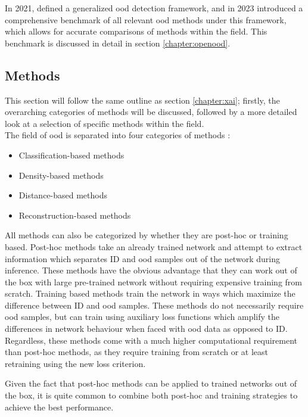\documentclass[UKenglish]{uiomasterthesis} %
\theoremstyle{definition}
\begin{document}
In 2021, \cite{oodoverview} defined a generalized \ac{ood} detection framework, and in 2023 \cite{openood} introduced a comprehensive benchmark of all relevant \ac{ood} methods under this framework, which allows for accurate comparisons of methods within the field. This benchmark is discussed in detail in section \ref{chapter:openood}.

\subsection{Methods}

This section will follow the same outline as section \ref{chapter:xai}; firstly, the overarching categories of methods will be discussed, followed by a more detailed look at a selection of specific methods within the field.
\\

The field of \ac{ood} is separated into four categories of methods \cite{oodoverview}:

\begin{itemize}
  \item Classification-based methods
  \item Density-based methods
  \item Distance-based methods
  \item Reconstruction-based methods
\end{itemize}

All methods can also be categorized by whether they are post-hoc or training based. Post-hoc methods take an already trained network and attempt to extract information which separates ID and \ac{ood} samples out of the network during inference. These methods have the obvious advantage that they can work out of the box with large pre-trained network without requiring expensive training from scratch. Training based methods train the network in ways which maximize the difference between ID and \ac{ood} samples. These methods do not necessarily require \ac{ood} samples, but can train using auxiliary loss functions which amplify the differences in network behaviour when faced with \ac{ood} data as opposed to ID. Regardless, these methods come with a much higher computational requirement than post-hoc methods, as they require training from scratch or at least retraining using the new loss criterion. 

Given the fact that post-hoc methods can be applied to trained networks out of the box, it is quite common to combine both post-hoc and training strategies to achieve the best performance.
\end{document}
